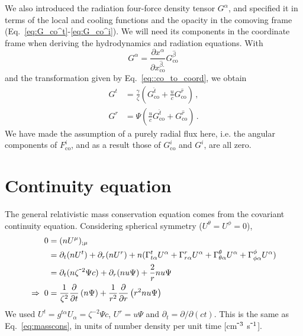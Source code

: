 \documentclass[../main.tex]{subfiles}
\begin{document}
We also introduced the radiation four-force density tensor $G^\alpha$, and specified it in terms of the local and cooling functions and the opacity in the comoving frame (Eq.~\ref{eq:G_co^t}-\ref{eq:G_co^i}). We will need its components in the coordinate frame when deriving the hydrodynamics and radiation equations. With
\begin{equation}
    G^\alpha=\frac{\partial x^\alpha}{\partial x^{\hat{\beta}.}_\text{co}}G^{\hat{\beta}}_\text{co}\,
\end{equation}
and the transformation given by Eq.~\eqref{eq::co_to_coord}, we obtain
\begin{align}
    G^t&=\frac{\gamma}{\zeta}\left(G^{\hat{t}}_\text{co}+\frac{u}{c}G^{\hat{r}}_\text{co}\right)\,,\\
    G^r&=\Psi\left(\frac{u}{c}G^{\hat{t}}_\text{co}+G^{\hat{r}}_\text{co}\right)\,.
\end{align}
We have made the assumption of a purely radial flux here, i.e. the angular components of $F^i_\text{co}$, and as a result those of $G^i_\text{co}$ and $G^i$, are all zero.

\section*{Continuity equation}
The general relativistic mass conservation equation comes from the covariant continuity equation.  Considering spherical symmetry ($U^\theta=U^\phi=0$),
\begin{align}
    0&=(nU^\mu)_{;\mu}\nonumber\\
    &=\partial_t(nU^t)+\partial_r(n U^r)+n(\Gamma^t_{t\alpha}U^\alpha+\Gamma^r_{r\alpha}U^\alpha+\Gamma^\theta_{\theta\alpha}U^\alpha+\Gamma^\phi_{\phi\alpha}U^\alpha)\nonumber\\
    &=\partial_t(n\zeta^{\-2}\Psi c)+\partial_r(n u\Psi)+\frac{2}{r}n u\Psi\nonumber\\
    \Rightarrow\; 0&=\frac{1}{\zeta^2}\Partial{t}{n \Psi}+\frac{1}{r^2}\Partial{r}{r^2n u\Psi}
\end{align}
We used $U^t=g^{t\alpha}U_\alpha=\zeta^{-2}\Psi c$, $U^r=u\Psi$ and $\partial_t=\partial/\partial(ct)$. This is the same as Eq.~\eqref{eq:masscons}, in units of number density per unit time [cm$^{\-3}$ s$^{\-1}$]. 

\end{document}

